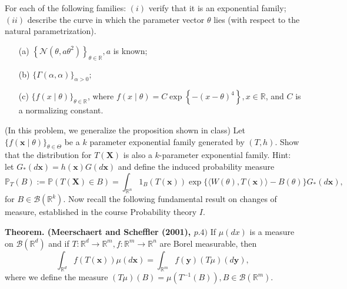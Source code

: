 \documentclass[12pt]{article}
\begin{document}
    \begin{exercise}
        For each of the following families: \((i)\) verify that it is an exponential family; \((i i)\) describe the curve in which the parameter vector \(\theta\) lies (with respect to the natural parametrization). 
        \begin{itemize}
            \item[(a)] \(\left\{\mathcal{N}\left(\theta, a \theta^{2}\right)\right\}_{\theta \in \mathbb{R}}, a\) is known;
            \item[(b)] \(\{\Gamma(\alpha, \alpha)\}_{\alpha>0} ;\)
            \item[(c)] \(\{f(x \mid \theta)\}_{\theta \in \mathbb{R}}\), where \(f(x \mid \theta)=C \exp \left\{-(x-\theta)^{4}\right\}, x \in \mathbb{R}\), and \(C\) is a normalizing constant.
        \end{itemize}
    \end{exercise}

    \begin{exercise}
        (In this problem, we generalize the proposition shown in class) Let \(\{f(\mathbf{x} \mid \theta)\}_{\theta \in \Theta}\) be a \(k\) parameter exponential family generated by \((T, h)\). Show that the distribution for \(T(\mathbf{X})\) is also a \(k\)-parameter exponential family. Hint: let \(G_{*}(d \mathbf{x})=h(\mathbf{x}) G(d \mathbf{x})\) and define the induced probability measure
        \[
            \mathbb{P}_{T}(B):=\mathbb{P}(T(\mathbf{X}) \in B)=\int_{\mathbb{R}^{n}} 1_{B}(T(\mathbf{x})) \exp \{\langle W(\theta), T(\mathbf{x})\rangle-B(\theta)\} G_{*}(d \mathbf{x}), 
        \]
        for \(B \in \mathcal{B}\left(\mathbb{R}^{k}\right)\). Now recall the following fundamental result on changes of measure, established in the course Probability theory \(I\). 

        {\bfseries Theorem. (Meerschaert and Scheffler (2001), \(p .4)\)} If \(\mu(d x)\) is a measure on \(\mathcal{B}\left(\mathbb{R}^{d}\right)\) and if \(T: \mathbb{R}^{d} \rightarrow \mathbb{R}^{m}, f: \mathbb{R}^{m} \rightarrow \mathbb{R}^{n}\) are Borel measurable, then
        \[
            \int_{\mathbb{R}^{d}} f(T(\boldsymbol{x})) \mu(d \boldsymbol{x})=\int_{\mathbb{R}^{m}} f(\boldsymbol{y})(T \mu)(d \boldsymbol{y}),
        \]
        where we define the measure \((T \mu)(B)=\mu\left(T^{-1}(B)\right), B \in \mathcal{B}\left(\mathbb{R}^{m}\right)\). 
    \end{exercise}




    
        
\end{document}
